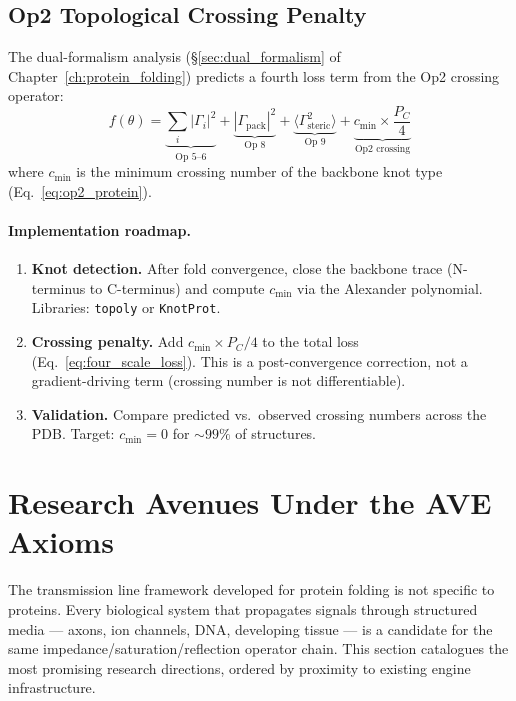 \subsection{Op2 Topological Crossing Penalty}
\label{sec:op2_crossing_ch4}

The dual-formalism analysis (\S\ref{sec:dual_formalism} of
Chapter~\ref{ch:protein_folding}) predicts a fourth loss term
from the Op2 crossing operator:
\begin{equation}
    f(\theta) = \underbrace{\sum_i |\Gamma_i|^2}_{\text{Op 5--6}}
    + \underbrace{|\Gamma_\text{pack}|^2}_{\text{Op 8}}
    + \underbrace{\langle\Gamma_\text{steric}^2\rangle}_{\text{Op 9}}
    + \underbrace{c_{\min} \times \frac{P_C}{4}}_{\text{Op2 crossing}}
    \label{eq:four_scale_loss}
\end{equation}
where $c_{\min}$ is the minimum crossing number of the
backbone knot type (Eq.~\ref{eq:op2_protein}).

\paragraph{Implementation roadmap.}
\begin{enumerate}
    \item \textbf{Knot detection.}  After fold convergence,
          close the backbone trace (N-terminus to C-terminus)
          and compute $c_{\min}$ via the Alexander polynomial.
          Libraries: \texttt{topoly} or \texttt{KnotProt}.
    \item \textbf{Crossing penalty.}  Add $c_{\min} \times P_C/4$
          to the total loss (Eq.~\ref{eq:four_scale_loss}).
          This is a post-convergence correction, not a
          gradient-driving term (crossing number is not
          differentiable).
    \item \textbf{Validation.}  Compare predicted vs.\
          observed crossing numbers across the PDB.
          Target: $c_{\min} = 0$ for $\sim 99\%$ of structures.
\end{enumerate}

\section{Research Avenues Under the AVE Axioms}
\label{sec:research_avenues}

The transmission line framework developed for protein folding
is not specific to proteins.  Every biological system that
propagates signals through structured media --- axons, ion
channels, DNA, developing tissue --- is a candidate for the
same impedance/saturation/reflection operator chain.  This
section catalogues the most promising research directions,
ordered by proximity to existing engine infrastructure.

